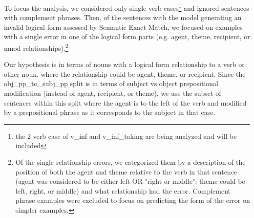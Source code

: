 \documentclass[11pt]{article}
\begin{document}
To focus the analysis, we considered only single verb cases\footnote{the 2 verb case of v\_inf and v\_inf\_taking are being analyzed and will be included} and ignored sentences with complement phrases. Then, of the sentences with the model generating an invalid logical form assessed by Semantic Exact Match, we focused on examples with a single error in one of the logical form parts (e.g. agent, theme, recipient, or nmod relationships).\footnote{Of the single relationship errors, we categorized them by a description of the position of both the agent and theme relative to the verb in that sentence (agent was considered to be either left OR "right or middle"; theme could be left, right, or middle) and what relationship had the error. Complement phrase examples were excluded to focus on predicting the form of the error on simpler examples.}

Our hypothesis is in terms of nouns with a logical form relationship to a verb or other noun, where the relationship could be agent, theme, or recipient.
Since the obj\_pp\_to\_subj\_pp split is in terms of subject vs object prepositional modification (instead of agent, recipient, or theme), we use the subset of sentences within this split where the agent is to the left of the verb and modified by a prepositional phrase as it corresponds to the subject in that case.
\end{document}

